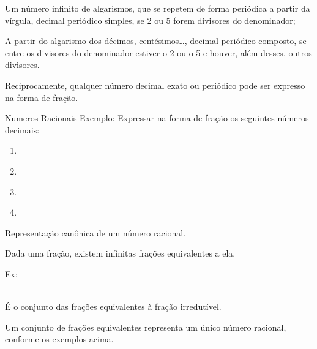 \begin{multicols*}{2}
	Um número infinito de algarismos, que se repetem de forma periódica a partir da vírgula, decimal periódico simples, se 2 ou 5 forem divisores do denominador;

	A partir do algarismo dos décimos, centésimos…, decimal periódico composto, se entre os divisores do denominador estiver o 2 ou o 5 e houver, além desses, outros divisores.

	Reciprocamente, qualquer número decimal exato ou periódico pode ser expresso na forma de fração.

	Numeros Racionais
	Exemplo:
	Expressar na forma de fração os seguintes números decimais:

	\begin{enumerate}

		\item {}\\

		\item {}\\

		\item {} \\

		\item {} 

	\end{enumerate}

	Representação canônica de um número racional.

	Dada uma fração, existem infinitas frações equivalentes a ela.

	Ex:

	\\

	É o conjunto das frações equivalentes à fração irredutível.

	Um conjunto de frações equivalentes representa um único número racional, conforme os exemplos acima.


\end{multicols*}
